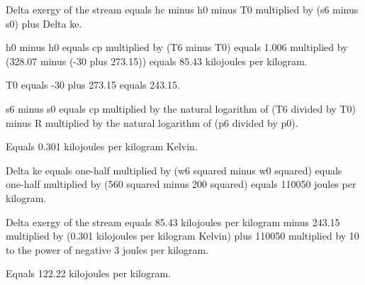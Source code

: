 Delta exergy of the stream equals hc minus h0 minus T0 multiplied by (s6 minus s0) plus Delta ke.  

h0 minus h0 equals cp multiplied by (T6 minus T0) equals 1.006 multiplied by (328.07 minus (-30 plus 273.15)) equals 85.43 kilojoules per kilogram.  

T0 equals -30 plus 273.15 equals 243.15.  

s6 minus s0 equals cp multiplied by the natural logarithm of (T6 divided by T0) minus R multiplied by the natural logarithm of (p6 divided by p0).  

Equals 0.301 kilojoules per kilogram Kelvin.  

Delta ke equals one-half multiplied by (w6 squared minus w0 squared) equals one-half multiplied by (560 squared minus 200 squared) equals 110050 joules per kilogram.  

Delta exergy of the stream equals 85.43 kilojoules per kilogram minus 243.15 multiplied by (0.301 kilojoules per kilogram Kelvin) plus 110050 multiplied by 10 to the power of negative 3 joules per kilogram.  

Equals 122.22 kilojoules per kilogram.